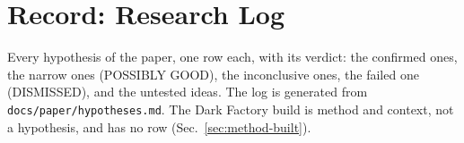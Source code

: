 \documentclass[conference]{IEEEtran}
\newcommand{\code}[1]{\texttt{#1}}
\begin{document}
\section{Record: Research Log}
\label{sec:register}

Every hypothesis of the paper, one row each, with its verdict: the confirmed ones, the narrow ones (POSSIBLY GOOD), the inconclusive ones, the failed one (DISMISSED), and the untested ideas. The log is generated from \code{docs/paper/hypotheses.md}. The Dark Factory build is method and context, not a hypothesis, and has no row (Sec.~\ref{sec:method-built}).



\end{document}
